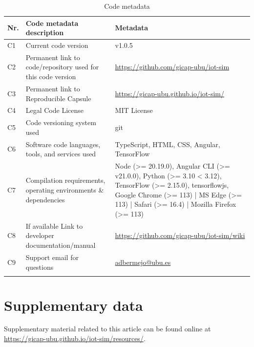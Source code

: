 \documentclass[preprint,12pt, a4paper]{elsarticle}
\begin{document}
\begin{longtable}{|l|p{6.5cm}|p{6.5cm}|}
\hline
\textbf{Nr.} & \textbf{Code metadata description} & \textbf{Metadata} \\
\hline
C1 & Current code version & v1.0.5 \\
\hline
C2 & Permanent link to code/repository used for this code version & \url{https://github.com/gicap-ubu/iot-sim} \\
\hline
C3 & Permanent link to Reproducible Capsule & \url{https://gicap-ubu.github.io/iot-sim/} \\
\hline
C4 & Legal Code License & MIT License \\
\hline
C5 & Code versioning system used & git \\
\hline
C6 & Software code languages, tools, and services used & TypeScript, HTML, CSS, Angular, TensorFlow \\
\hline
C7 & Compilation requirements, operating environments \& dependencies & Node (>= 20.19.0), Angular CLI (>= v21.0.0), Python (>= 3.10 < 3.12), TensorFlow (>= 2.15.0), tensorflowjs, Google Chrome (>= 113) | MS Edge (>= 113) | Safari (>= 16.4) | Mozilla Firefox (>= 113) \\
\hline
C8 & If available Link to developer documentation/manual & \url{https://github.com/gicap-ubu/iot-sim/wiki} \\
\hline
C9 & Support email for questions & \url{adbermejo@ubu.es} \\
\hline
\caption{Code metadata}
\label{table:codeMetadata} 
\end{longtable}


 
 
 
 



\appendix
\section{Supplementary data}
\label{app:SupplementaryData}
Supplementary material related to this article can be found online at \url{https://gicap-ubu.github.io/iot-sim/resources/}.

 

\end{document}
